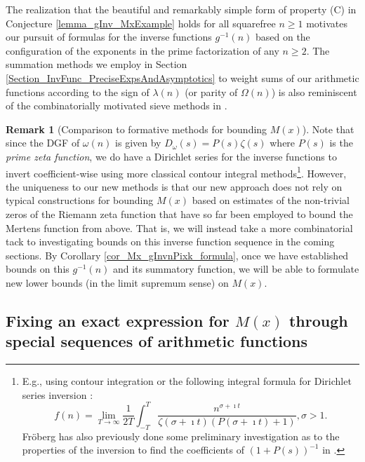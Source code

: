 \documentclass[11pt,reqno,a4letter]{article}
\numberwithin{figure}{section}
\numberwithin{table}{section}
\theoremstyle{plain}
\numberwithin{theorem}{section}
\theoremstyle{definition}
\newtheorem{remark}[theorem]{Remark}
\begin{document}
The realization that the beautiful and remarkably simple form of property (C) 
in Conjecture \ref{lemma_gInv_MxExample} holds for all squarefree $n \geq 1$ 
motivates our pursuit of formulas for the inverse functions $g^{-1}(n)$ based on the configuration of the 
exponents in the prime factorization of any $n \geq 2$. 
The summation methods we employ in Section \ref{Section_InvFunc_PreciseExpsAndAsymptotics} 
to weight sums of our arithmetic functions according to the sign of 
$\lambda(n)$ (or parity of $\Omega(n)$) is also 
reminiscent of the combinatorially motivated sieve methods in 
\cite[\S 17]{OPERADECRIBERO}. 

\begin{remark}[Comparison to formative methods for bounding $M(x)$]
Note that since the DGF of $\omega(n)$ is given by 
$D_{\omega}(s) = P(s) \zeta(s)$ where $P(s)$ is the \emph{prime zeta function}, we do have a 
Dirichlet series for the inverse functions to invert coefficient-wise using more classical 
contour integral methods\footnote{
E.g., using contour integration or the following integral formula for Dirichlet series 
inversion \cite[\S 11]{APOSTOLANUMT}: 
\[
f(n) = \lim_{T \rightarrow \infty} \frac{1}{2T} \int_{-T}^{T} 
     \frac{n^{\sigma+\imath t}}{\zeta(\sigma+\imath t)(P(\sigma+\imath t) + 1)}, \sigma > 1. 
\]
Fr\"oberg has also previously done some preliminary investigation as to the properties of the 
inversion to find the coefficients of $(1+P(s))^{-1}$ in \cite{FROBERG-1968}. 
}. 
However, the uniqueness to our new methods is that our new approach does not rely on typical constructions for 
bounding $M(x)$ based on estimates of the non-trivial zeros of the Riemann zeta function that have so far 
been employed to bound the Mertens function from above. 
That is, we will instead take a more combinatorial tack to investigating bounds on this inverse function 
sequence in the coming sections. By Corollary \ref{cor_Mx_gInvnPixk_formula}, 
once we have established bounds on this $g^{-1}(n)$ and its summatory function, we will be able to 
formulate new lower bounds (in the limit supremum sense) on $M(x)$. 
\end{remark} 

\subsection{Fixing an exact expression for $M(x)$ through special sequences of arithmetic functions} 
\end{document}
